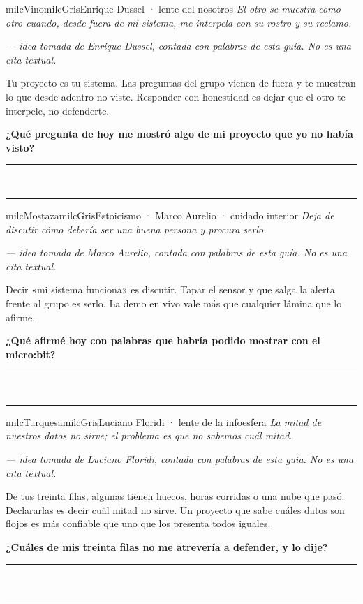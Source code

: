 \documentclass[11pt,letterpaper]{article}
\newcommand{\linead}[1]{\noindent\color{milcLinea}\rule{#1}{0.5pt}\color{milcNegro}}
\begin{document}
\begin{softbox}{milcVino}{milcGris}{Enrique Dussel · lente del nosotros}
\textit{El otro se muestra como otro cuando, desde fuera de mi sistema, me interpela con su rostro y su reclamo.}

{\footnotesize\itshape\color{milcNegro!70}--- idea tomada de Enrique Dussel, contada con palabras de esta guía. No es una cita textual.}

Tu proyecto es tu sistema. Las preguntas del grupo vienen de fuera y te muestran lo que desde adentro no viste. Responder con honestidad es dejar que el otro te interpele, no defenderte.

\textbf{¿Qué pregunta de hoy me mostró algo de mi proyecto que yo no había visto?}
\end{softbox}
\linead{\linewidth}\\[1mm]
\linead{\linewidth}

\begin{softbox}{milcMostaza}{milcGris}{Estoicismo · Marco Aurelio · cuidado interior}
\textit{Deja de discutir cómo debería ser una buena persona y procura serlo.}

{\footnotesize\itshape\color{milcNegro!70}--- idea tomada de Marco Aurelio, contada con palabras de esta guía. No es una cita textual.}

Decir «mi sistema funciona» es discutir. Tapar el sensor y que salga la alerta frente al grupo es serlo. La demo en vivo vale más que cualquier lámina que lo afirme.

\textbf{¿Qué afirmé hoy con palabras que habría podido mostrar con el micro:bit?}
\end{softbox}
\linead{\linewidth}\\[1mm]
\linead{\linewidth}

\begin{softbox}{milcTurquesa}{milcGris}{Luciano Floridi · lente de la infoesfera}
\textit{La mitad de nuestros datos no sirve; el problema es que no sabemos cuál mitad.}

{\footnotesize\itshape\color{milcNegro!70}--- idea tomada de Luciano Floridi, contada con palabras de esta guía. No es una cita textual.}

De tus treinta filas, algunas tienen huecos, horas corridas o una nube que pasó. Declararlas es decir cuál mitad no sirve. Un proyecto que sabe cuáles datos son flojos es más confiable que uno que los presenta todos iguales.

\textbf{¿Cuáles de mis treinta filas no me atrevería a defender, y lo dije?}
\end{softbox}
\linead{\linewidth}\\[1mm]
\linead{\linewidth}
\end{document}
